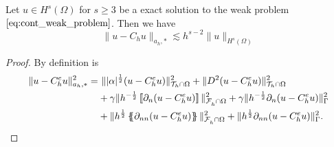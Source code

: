 \begin{lemma}
    \label{lemma:astar_estimate}
    Let $u \in H^{s}( \Omega ) $ for $s\ge 3$ be a exact solution to the weak problem $\eqref{eq:cont_weak_problem} $. Then we have  \[
    \|  u - C_{h}u \|_{ a_{h},*  }^{  } \lesssim h^{s-2} \| u \|_{ H^{s}( \Omega )  }^{  }
    \]

\end{lemma}
\begin{proof}
    By definition is
    \[
        \begin{split}
            \| u - C_{h}^{e}u \|_{ a_{h}, * }^{  2}  =& \ \| |\alpha |^{\frac{1}{2}} ( u - C_{h}^{e}u) \|_{ \mathcal{T} _{h} \cap \Omega  }^{ 2}  + \| D^2 ( u - C_{h}^{e}u ) \|_{\mathcal{T} _{h} \cap \Omega   }^{ 2 } \\  &  + \gamma \| h^{-\frac{1}{2}} \left[\!\left[  \partial _{n} (u -
        C_{h}^{e} u)  \right]\!\right]   \|_{ \mathcal{F}_{h}^{}\cap \Omega    }^{ 2
        } + \gamma \| h^{-\frac{1}{2}}  \partial _{n} (u - C_{h}^{e}u)    \|_{ \Gamma   }^{ 2 } \\
          & + \| h^{\frac{1}{2}} \left\{\!\!\left\{ \partial _{nn} (u - C_{h}^{e}u) \right\}\!\!\right\}   \|_{\mathcal{F} _{h}^{} \cap \Omega   }^{  2} +  \| h^{\frac{1}{2}} \partial _{nn}(u - C_{h}^{e}u)     \|_{ \Gamma }^{  2}.
        \end{split}
    \]


\end{proof}
